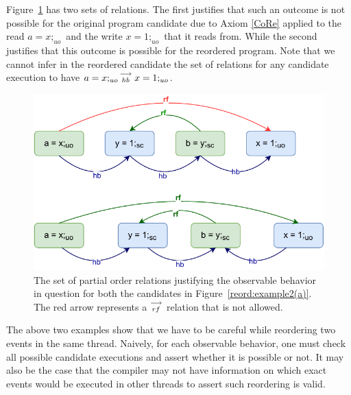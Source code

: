        Figure~\ref{reord:example2(b)} has two sets of relations. 
        The first justifies that such an outcome is not possible for the original program candidate due to Axiom \ref{CoRe} applied to the read $a=x;_{uo}$ and the write $x=1;_{uo}$ that it reads from. 
        While the second justifies that this outcome is possible for the reordered program.
        Note that we cannot infer in the reordered candidate the set of relations for any candidate execution to have $a=x;_{uo}\stackrel{\longrightarrow}{_{hb}}x=1;_{uo}$. 
        \begin{figure}[H]
            \centering
            \includegraphics[scale=0.7]{4.InstructionReordering/0.Intro/ReorderingExample2(b).pdf}
            \caption{The set of partial order relations justifying the observable behavior in question for both the candidates in Figure~\ref{reord:example2(a)}. The red arrow represents a $\stackrel{\longrightarrow}{_{rf}}$ relation that is not allowed.} 
            \label{reord:example2(b)}
        \end{figure}

        The above two examples show that we have to be careful while reordering two events in the same thread. 
        Naively, for each observable behavior, one must check all possible candidate executions and assert whether it is possible or not. 
        It may also be the case that the compiler may not have information on which exact events would be executed in other threads to assert such reordering is valid. 

    
    
    
    
    